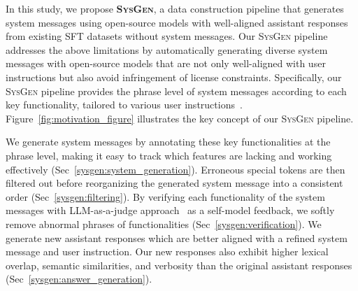 In this study, we propose \textbf{\textsc{SysGen}}, a data construction pipeline that generates system messages using open-source models with well-aligned assistant responses from existing SFT datasets without system messages.
Our \textsc{SysGen} pipeline addresses the above limitations by automatically generating diverse system messages with open-source models that are not only well-aligned with user instructions but also avoid infringement of license constraints.
Specifically, our \textsc{SysGen} pipeline provides the phrase level of system messages according to each key functionality, tailored to various user instructions~\citep{alkhamissi2024investigating, jiang2024evaluating, qian2024tell, lee2024aligning}.
Figure~\ref{fig:motivation_figure} illustrates the key concept of our \textsc{SysGen} pipeline.

We generate system messages by annotating these key functionalities at the phrase level, making it easy to track which features are lacking and working effectively (Sec~\ref{sysgen:system_generation}).
Erroneous special tokens are then filtered out before reorganizing the generated system message into a consistent order (Sec~\ref{sysgen:filtering}).
By verifying each functionality of the system messages with LLM-as-a-judge approach~\citep{zheng2023judging} as a self-model feedback, we softly remove abnormal phrases of functionalities (Sec~\ref{sysgen:verification}).
We generate new assistant responses which are better aligned with a refined system message and user instruction.
Our new responses also exhibit higher lexical overlap, semantic similarities, and verbosity than the original assistant responses (Sec~\ref{sysgen:answer_generation}).


